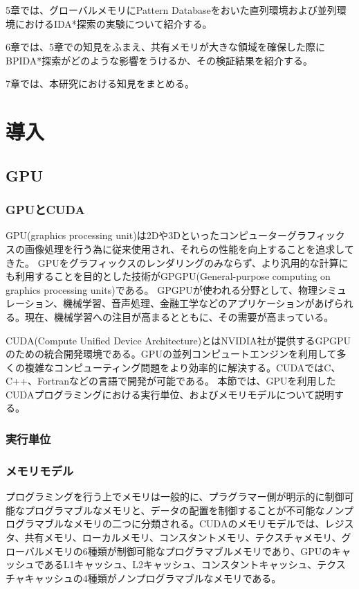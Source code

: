 \documentclass[a4paper,11pt,oneside,openany]{jsbook}
\begin{document}
5章では、グローバルメモリにPattern Databaseをおいた直列環境および並列環境におけるIDA*探索の実験について紹介する。

6章では、5章での知見をふまえ、共有メモリが大きな領域を確保した際にBPIDA*探索がどのような影響をうけるか、その検証結果を紹介する。

7章では、本研究における知見をまとめる。

\chapter{導入}
\section{GPU}
\subsection{GPUとCUDA}
GPU(graphics processing unit)は2Dや3Dといったコンピューターグラフィックスの画像処理を行う為に従来使用され、それらの性能を向上することを追求してきた。
GPUをグラフィックスのレンダリングのみならず、より汎用的な計算にも利用することを目的とした技術がGPGPU(General-purpose computing on graphics processing units)である。
GPGPUが使われる分野として、物理シミュレーション、機械学習、音声処理、金融工学などのアプリケーションがあげられる。現在、機械学習への注目が高まるとともに、その需要が高まっている。


CUDA(Compute Unified Device Architecture)とはNVIDIA社が提供するGPGPUのための統合開発環境である。GPUの並列コンピュートエンジンを利用して多くの複雑なコンピューティング問題をより効率的に解決する。CUDAではC、C++、Fortranなどの言語で開発が可能である。
本節では、GPUを利用したCUDAプログラミングにおける実行単位、およびメモリモデルについて説明する。

\subsection{実行単位}

\subsection{メモリモデル}
プログラミングを行う上でメモリは一般的に、プラグラマー側が明示的に制御可能なプログラマブルなメモリと、データの配置を制御することが不可能なノンプログラマブルなメモリの二つに分類される。CUDAのメモリモデルでは、レジスタ、共有メモリ、ローカルメモリ、コンスタントメモリ、テクスチャメモリ、グローバルメモリの6種類が制御可能なプログラマブルメモリであり、GPUのキャッシュであるL1キャッシュ、L2キャッシュ、コンスタントキャッシュ、テクスチャキャッシュの4種類がノンプログラマブルなメモリである。
\end{document}
